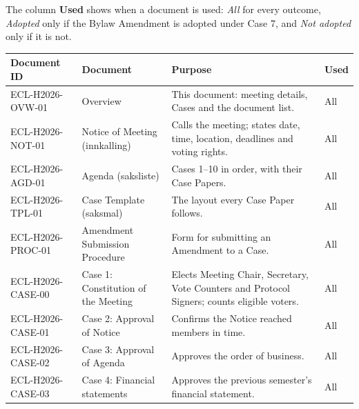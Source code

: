 \documentclass{../../../Common/Latex/Templates/rapport}
\begin{document}
The column \textbf{Used} shows when a document is used: \emph{All} for every outcome, \emph{Adopted} only if the Bylaw Amendment is adopted under Case 7, and \emph{Not adopted} only if it is not.

\begingroup
\small
\renewcommand{\arraystretch}{1.3}
\begin{longtable}{|L{3.2cm}|L{3.6cm}|L{5.3cm}|L{1.9cm}|}
  \hline
  \textbf{Document ID} & \textbf{Document} & \textbf{Purpose} & \textbf{Used} \\
  \hline
  \endhead
  ECL-H2026-OVW-01    & Overview                                        & This document: meeting details, Cases and the document list.                                  & All \\
  \hline
  ECL-H2026-NOT-01    & Notice of Meeting (innkalling)                  & Calls the meeting; states date, time, location, deadlines and voting rights.                  & All \\
  \hline
  ECL-H2026-AGD-01    & Agenda (saksliste)                              & Cases 1--10 in order, with their Case Papers.                                                 & All \\
  \hline
  ECL-H2026-TPL-01    & Case Template (saksmal)                         & The layout every Case Paper follows.                                                          & All \\
  \hline
  ECL-H2026-PROC-01   & Amendment Submission Procedure                  & Form for submitting an Amendment to a Case.                                                   & All \\
  \hline
  ECL-H2026-CASE-00   & Case 1: Constitution of the Meeting             & Elects Meeting Chair, Secretary, Vote Counters and Protocol Signers; counts eligible voters.   & All \\
  \hline
  ECL-H2026-CASE-01   & Case 2: Approval of Notice                      & Confirms the Notice reached members in time.                                                  & All \\
  \hline
  ECL-H2026-CASE-02   & Case 3: Approval of Agenda                      & Approves the order of business.                                                               & All \\
  \hline
  ECL-H2026-CASE-03   & Case 4: Financial statements                     & Approves the previous semester's financial statement.                                         & All \\
  \hline

\end{longtable}
\end{document}
